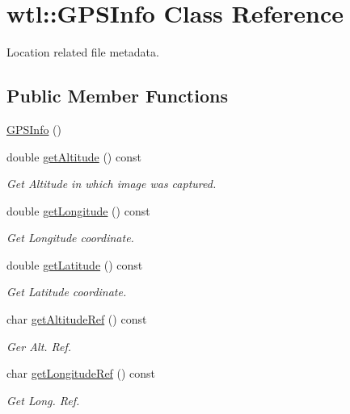\hypertarget{classwtl_1_1_g_p_s_info}{}\section{wtl\+:\+:G\+P\+S\+Info Class Reference}
\label{classwtl_1_1_g_p_s_info}


Location related file metadata.  


\subsection*{Public Member Functions}
\begin{DoxyCompactItemize}
\item 
\hyperlink{classwtl_1_1_g_p_s_info_a7e2bea7fbd2a750d8c1a5d4c490247be}{G\+P\+S\+Info} ()
\item 
double \hyperlink{classwtl_1_1_g_p_s_info_aa872765acb42234e9cd95f2caf3b79ca}{get\+Altitude} () const
\begin{DoxyCompactList}\small\item\em Get Altitude in which image was captured. \end{DoxyCompactList}\item 
double \hyperlink{classwtl_1_1_g_p_s_info_a377631688df7ecb4d6d35a40eb657a6f}{get\+Longitude} () const
\begin{DoxyCompactList}\small\item\em Get Longitude coordinate. \end{DoxyCompactList}\item 
double \hyperlink{classwtl_1_1_g_p_s_info_a49ee0291a45c95c3f06f6841e9862ec6}{get\+Latitude} () const
\begin{DoxyCompactList}\small\item\em Get Latitude coordinate. \end{DoxyCompactList}\item 
char \hyperlink{classwtl_1_1_g_p_s_info_aab9f9d61721676df7830d879010edc8b}{get\+Altitude\+Ref} () const
\begin{DoxyCompactList}\small\item\em Ger Alt. Ref. \end{DoxyCompactList}\item 
char \hyperlink{classwtl_1_1_g_p_s_info_a4034566abc908fc80e0299486efcb9ee}{get\+Longitude\+Ref} () const
\begin{DoxyCompactList}\small\item\em Get Long. Ref. \end{DoxyCompactList}\item 

\end{DoxyCompactItemize}
